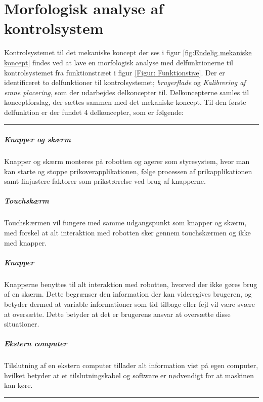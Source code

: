 \chapter{Morfologisk analyse af kontrolsystem} \label{Bilag - morf til kontrolsystem}

Kontrolsystemet til det mekaniske koncept der ses i figur \ref{fig:Endelig mekaniske koncept} findes ved at lave en morfologisk analyse med delfunktionerne til kontrolsystemet fra funktionstræet i figur \ref{Figur: Funktionstræ}. Der er identificeret to delfunktioner til kontrolsystemet; \textit{brugerflade} og \textit{Kalibrering af emne placering}, som der udarbejdes delkoncepter til. Delkoncepterne samles til konceptforslag, der sættes sammen med det mekaniske koncept. Til den første delfunktion er der fundet 4 delkoncepter, som er følgende: \plainbreak{0.5}
\paragraph{Knapper og skærm}
Knapper og skærm monteres på robotten og agerer som styresystem, hvor man kan starte og stoppe prikoverapplikationen, følge processen af prikapplikationen samt finjustere faktorer som prikstørrelse ved brug af knapperne.

\paragraph{Touchskærm}
Touchskærmen vil fungere med samme udgangspunkt som knapper og skærm, med forskel at alt interaktion med robotten sker gennem touchskærmen og ikke med knapper.

\paragraph{Knapper}
Knapperne benyttes til alt interaktion med robotten, hvorved der ikke gøres brug af en skærm. Dette begrænser den information der kan videregives brugeren, og betyder dermed at variable informationer som tid tilbage eller fejl vil være svære at oversætte. Dette betyder at det er brugerens ansvar at oversætte disse situationer.

\paragraph{Ekstern computer}
Tilslutning af en ekstern computer tillader alt information vist på egen computer, hvilket betyder at et tilslutningskabel og software er nødvendigt for at maskinen kan køre.
\plainbreak{1}

